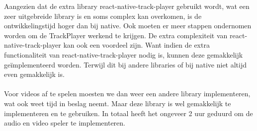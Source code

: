 Aangezien dat de extra library react-native-track-player gebruikt wordt, wat een zeer 
uitgebreide library is en soms complex kan overkomen, is de ontwikkelingstijd hoger dan bij native. 
Ook moeten er meer stappen ondernomen worden om de TrackPlayer werkend te krijgen.
De extra complexiteit van react-native-track-player kan ook een voordeel zijn. Want indien de
extra functionaliteit van react-native-track-player nodig is, kunnen deze gemakkelijk geïmplementeerd worden.
Terwijl dit bij andere libraries of bij native niet altijd even gemakkelijk is.
\\\\
Voor videos af te spelen moesten we dan weer een andere library implementeren, wat ook weet 
tijd in beslag neemt. Maar deze library is wel gemakkelijk te implementeren en te gebruiken.
In totaal heeft het ongeveer 2 uur geduurd om de audio en video speler te implementeren.

